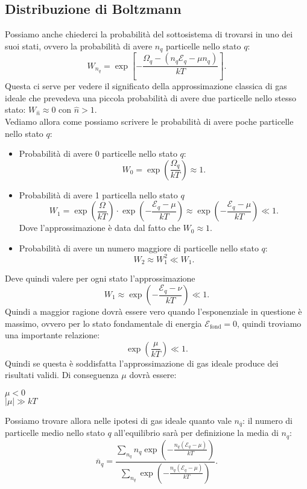 \subsection{Distribuzione di Boltzmann}%
\label{sec:Boltzmann_distrib}
Possiamo anche chiederci la probabilità del sottosistema di trovarsi in uno dei suoi stati, ovvero la probabilità di avere $n_{q}$ particelle nello stato $q$:
\[
	W_{n_{q}} = \exp\left[ -\frac{\Omega_{q} - \left( n_{q}\mathcal{E}_{q} - \mu n_{q} \right) }{kT} \right] 
.\] 
Questa ci serve per vedere il significato della approssimazione classica di gas ideale che prevedeva una piccola probabilità di avere due particelle nello stesso stato: $W_{\hat{n}} \approx 0$ con $\hat{n} > 1$. \\
Vediamo allora come possiamo scrivere le probabilità di avere poche particelle nello stato $q$:
\begin{itemize}
	\item Probabilità di avere 0 particelle nello stato $q$:
		\[
			W_0 = \exp \left( \frac{\Omega_{q}}{kT} \right) \approx 1
		.\] 
	\item Probabilità di avere 1 particella nello stato $q$
		\[
			W_1 = \exp\left( \frac{\Omega}{kT} \right) \cdot \exp\left( - \frac{\mathcal{E}_{q}-\mu}{kT} \right) \approx
			\exp\left( - \frac{\mathcal{E}_{q}-\mu}{kT} \right) \ll 1
		.\] 
		Dove l'approssimazione è data dal fatto che $W_0 \approx 1$.
	\item Probabilità di avere un numero maggiore di particelle nello stato $q$:
		\[
			W_2 \approx W_1^2 \ll W_1
		.\] 
\end{itemize}
Deve quindi valere per ogni stato l'approssimazione 
\[
	W_1 \approx \exp\left( - \frac{\mathcal{E}_{q}-\nu}{kT}\right) \ll 1
.\]
Quindi a maggior ragione dovrà essere vero quando l'esponenziale in questione è massimo, ovvero per lo stato fondamentale di energia $\mathcal{E}_{\text{fond}}=0$, quindi troviamo una importante relazione:
\[
	\exp\left( \frac{\mu}{kT} \right) \ll 1
.\] \label{eq:ideal_gas_approx}
Quindi se questa è soddisfatta l'approssimazione di gas ideale produce dei risultati validi. Di conseguenza $\mu$ dovrà essere:
\begin{center}
	$\mu <0$\\
	$\left| \mu \right|  \gg kT$ 
\end{center}
Possiamo trovare allora nelle ipotesi di gas ideale quanto vale $n_{\overline{q}}$: il numero di particelle medio nello stato $q$ all'equilibrio sarà per definizione la media di $n_{q}$:
\[
	\overline{n}_{q}= \frac{\sum_{n_{q}}^{} n_{q}\exp\left( -\frac{n_{q}\left( \mathcal{E}_{q}-\mu \right) }{kT} \right) }
	{\sum_{n_{q}}^{} \exp\left( -\frac{n_{q}\left( \mathcal{E}_{q}-\mu \right) }{kT} \right) } .\] 
